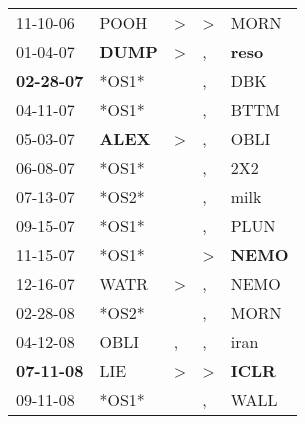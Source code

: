 \begin{supertabular}{p{0.07\textwidth}p{0.06\textwidth}p{0.02\textwidth}p{0.02\textwidth}p{0.06\textwidth}}
          11-10-06\textsuperscript{} &           POOH\textsuperscript{} &     \textgreater &     \textgreater &           MORN\textsuperscript{} \\
          01-04-07\textsuperscript{} &  \textbf{DUMP\textsuperscript{}} &     \textgreater &                , &  \textbf{reso\textsuperscript{}} \\
 \textbf{02-28-07\textsuperscript{}} &                            *OS1* &                  &                , &            DBK\textsuperscript{} \\
          04-11-07\textsuperscript{} &                            *OS1* &                  &                , &           BTTM\textsuperscript{} \\
          05-03-07\textsuperscript{} &  \textbf{ALEX\textsuperscript{}} &     \textgreater &                , &           OBLI\textsuperscript{} \\
          06-08-07\textsuperscript{} &                            *OS1* &                  &                , &            2X2\textsuperscript{} \\
          07-13-07\textsuperscript{} &                            *OS2* &                  &                , &           milk\textsuperscript{} \\
          09-15-07\textsuperscript{} &                            *OS1* &                  &                , &           PLUN\textsuperscript{} \\
          11-15-07\textsuperscript{} &                            *OS1* &                  &     \textgreater &  \textbf{NEMO\textsuperscript{}} \\
          12-16-07\textsuperscript{} &           WATR\textsuperscript{} &     \textgreater &                , &           NEMO\textsuperscript{} \\
          02-28-08\textsuperscript{} &                            *OS2* &                  &                , &           MORN\textsuperscript{} \\
          04-12-08\textsuperscript{} &           OBLI\textsuperscript{} &                , &                , &           iran\textsuperscript{} \\
 \textbf{07-11-08\textsuperscript{}} &            LIE\textsuperscript{} &     \textgreater &     \textgreater &  \textbf{ICLR\textsuperscript{}} \\
          09-11-08\textsuperscript{} &                            *OS1* &                  &                , &           WALL\textsuperscript{} \\

\end{supertabular}
